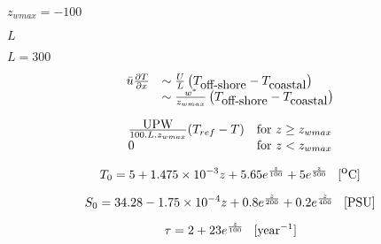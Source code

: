 {\newpage\clearpage
{}%
$z_{wmax}= - 100$%
\lthtmlinlinemathZ
\lthtmlcheckvsize\clearpage}

{\newpage\clearpage
{}%
$L$%
\lthtmlinlinemathZ
\lthtmlcheckvsize\clearpage}

{\newpage\clearpage
{}%
$L=300$%
\lthtmlinlinemathZ
\lthtmlcheckvsize\clearpage}

{\newpage\clearpage
{}%
\begin{displaymath}
\begin{array}{ll}
\bar{u} \frac{\partial T}{\partial x}
& \sim \frac{U}{L} 
\left(T_{\hbox{off-shore}}-T_{\hbox{coastal}}\right) \\
& \sim \frac{w^*}{z_{wmax}} 
\left(T_{\hbox{off-shore}}-T_{\hbox{coastal}}\right)
\end{array}
\end{displaymath}%
\lthtmldisplayZ
\lthtmlcheckvsize\clearpage}

{\newpage\clearpage
{}%
\begin{displaymath}
\begin{array}{ll}
\frac{\hbox{UPW}}{100.L.z_{wmax}}(T_{ref} - T) & \hbox{for } z\ge z_{wmax} \\
0 & \hbox{for } z < z_{wmax}
\end{array}
\end{displaymath}%
\lthtmldisplayZ
\lthtmlcheckvsize\clearpage}

{\newpage\clearpage
{}%
\begin{displaymath}
T_0=5+1.475\times 10^{-3}z+5.65 e^{\frac{z}{100}}+5e^{\frac{z}{500}}
\;\;\;[^{\hbox{o}}\hbox{C}]
 \end{displaymath}%
\lthtmldisplayZ
\lthtmlcheckvsize\clearpage}

{\newpage\clearpage
{}%
\begin{displaymath}
S_0=34.28-1.75\times 10^{-4}z+0.8 e^{\frac{z}{200}}+0.2e^{\frac{z}{400}}
 \;\;\;[\hbox{PSU}]
 \end{displaymath}%
\lthtmldisplayZ
\lthtmlcheckvsize\clearpage}

{\newpage\clearpage
{}%
\begin{displaymath}
\tau = 2 + 23 e^{\frac{z}{100}} \;\;\;[\hbox{year}^{-1}]
\end{displaymath}%
\lthtmldisplayZ
\lthtmlcheckvsize\clearpage}

